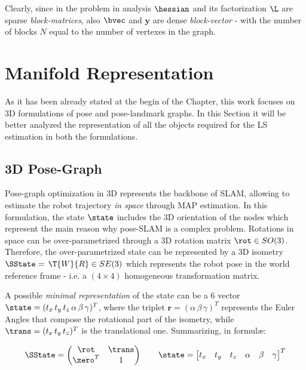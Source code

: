 Clearly, since in the problem in analysis $\hessian$ and its factorization $\L$ are sparse \textit{block-matrices}, also $\bvec$ and $\mathbf{y}$ are dense \textit{block-vector} - with the number of blocks $N$ equal to the number of vertexes in the graph.

\section{Manifold Representation}\label{sec:manifold_se3}
As it has been already stated at the begin of the Chapter, this work focuses on 3D formulations of pose and pose-landmark graphs. In this Section it will be better analyzed the representation of all the objects required for the LS estimation in both the formulations.

\subsection{3D Pose-Graph}\label{subsec:3d_pose_graphs}
Pose-graph optimization in 3D represents the backbone of SLAM, allowing to estimate the robot trajectory \textit{in space} through MAP estimation. In this formulation, the state $\state$ includes the 3D orientation of the nodes which represent the main reason why pose-SLAM is a complex problem. Rotations in space can be over-parametrized through a 3D rotation matrix $\rot \in SO(3)$. Therefore, the over-parametrized state can be represented by a 3D isometry $\SState = \,\T{W}{R} \in SE(3)$ which represents the robot pose in the world reference frame - i.e. a $(4 \times 4)$ homogeneous transformation matrix.

A possible \textit{minimal representation} of the state can be a $6$ vector $\state = (t_x\,t_y\,t_z\,\alpha\,\beta\,\gamma)^T$, where the triplet $\mathbf{r} = (\alpha\,\beta\,\gamma)^T$ represents the Euler Angles that compose the rotational part of the isometry, while $\trans = (t_x\,t_y\,t_z)^T$ is the translational one. Summarizing, in formul\ae:

\begin{equation*}
    \SState = 
        \begin{pmatrix}
            \rot & \trans \\ \zero^T & 1
        \end{pmatrix}
    \qquad 
    \state = \begin{bmatrix} t_x & t_y & t_z & \alpha & \beta & \gamma \end{bmatrix}^T
\end{equation*}

